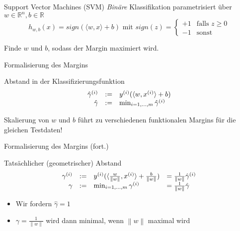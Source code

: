 \documentclass[xcolor={dvipsnames,svgnames},draft]{beamer}
\newcommand{\inner}[2]{\langle{} #1, #2 \rangle{}}
\newcommand{\norm}[1]{\left\lVert#1\right\rVert}
\begin{document}
\begin{frame}{Support Vector Machines (SVM)}
  \textit{Binäre} Klassifikation parametrisiert über $w \in \mathbb{R}^n, b \in
  \mathbb{R}$
  \[
    h_{w,b}(x) = sign(\inner{w}{x} + b) 
    \text{ mit } 
    sign(z) = \begin{cases}
      +1 & \text{falls } z \geq 0 \\
      -1 & \text{sonst}
    \end{cases}
  \]

  Finde $w$ und $b$, sodass der Margin maximiert wird.
\end{frame}

\begin{frame}{Formalisierung des Margins}
  \begin{definition}
    Abstand in der Klassifizierungsfunktion
    \[
      \begin{array}{r@{\quad:=\quad}l}
        \hat{\gamma}^{(i)} & y^{(i)}(\inner{w}{x^{(i)}}+b) \\
        \hat{\gamma} & \min_{i=1,\ldots,m}\hat{\gamma}^{(i)}
      \end{array}
    \]
  \end{definition}
  Skalierung von $w$ und $b$ führt zu verschiedenen funktionalen Margins für
  die gleichen Testdaten!
\end{frame}

\begin{frame}{Formalisierung des Margins (fort.)}
  \begin{definition}
    Tatsächlicher (geometrischer) Abstand
    \[
      \begin{array}{r@{\quad:=\quad}ll}
        \gamma^{(i)} & y^{(i)}(\inner{\frac{w}{\norm{w}}}{x^{(i)}}+\frac{b}{\norm{w}}) & = \frac{1}{\norm{w}} \hat{\gamma}^{(i)} \\
        \gamma & \min_{i=1,\ldots,m}\gamma^{(i)} & = \frac{1}{\norm{w}} \hat{\gamma}
      \end{array}
    \]
  \end{definition}

  \begin{itemize}
  \item Wir fordern $\hat{\gamma} = 1$
  \item $\gamma = \frac{1}{\norm{w}}$ wird dann minimal, wenn $\norm{w}$ maximal wird
  \end{itemize}
  
\end{frame}
\end{document}
